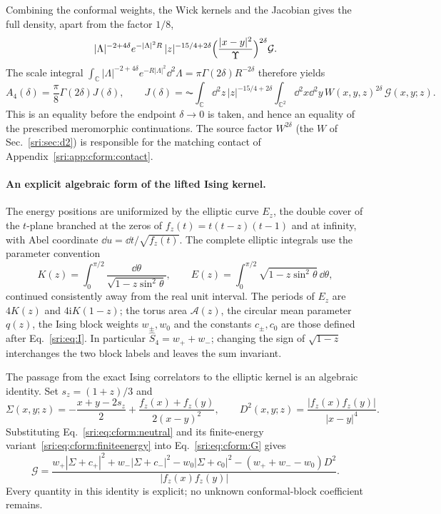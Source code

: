 Combining the conformal weights, the Wick kernels and the Jacobian gives the full density, apart from the factor $1/8$,
\begin{equation}
 |\Lambda|^{-2+4\delta}e^{-|\Lambda|^2R}\,|z|^{-15/4+2\delta}\Bigl(\frac{|x-y|^2}{\Upsilon}\Bigr)^{2\delta}\mathcal G.
\end{equation}
The scale integral $\int_{\mathbb C}|\Lambda|^{-2+4\delta}e^{-R|\Lambda|^2}\dd^2\Lambda=\pi\Gamma(2\delta)R^{-2\delta}$
therefore yields
\begin{equation}
 A_4(\delta)=\frac\pi8\Gamma(2\delta)J(\delta),\qquad
 J(\delta)=\AC\!\int_{\mathbb C}\dd^2z\,|z|^{-15/4+2\delta}\int_{\mathbb C^2}\dd^2x\dd^2y\,
 W(x,y,z)^{2\delta}\,\mathcal G(x,y;z).
 \label{sri:eq:cform:J}
\end{equation}
This is an equality before the endpoint $\delta\to0$ is taken, and hence an equality of the prescribed meromorphic
continuations. The source factor $W^{2\delta}$ (the $W$ of Sec.~\ref{sri:sec:d2}) is responsible for the matching contact
of Appendix~\ref{sri:app:cform:contact}.

\paragraph{An explicit algebraic form of the lifted Ising kernel.} The energy positions are uniformized by the
elliptic curve $E_z$, the double cover of the $t$-plane branched at the zeros of $f_z(t)=t(t-z)(t-1)$ and at infinity,
with Abel coordinate $\dd u=\dd t/\sqrt{f_z(t)}$. The complete elliptic integrals use the parameter convention
\begin{equation}
 K(z)=\int_0^{\pi/2}\frac{\dd\theta}{\sqrt{1-z\sin^2\theta}},\qquad
 E(z)=\int_0^{\pi/2}\sqrt{1-z\sin^2\theta}\,\dd\theta,
\end{equation}
continued consistently away from the real unit interval. The periods of $E_z$ are $4K(z)$ and $4\mathrm iK(1-z)$; the
torus area $\mathcal A(z)$, the circular mean parameter $q(z)$, the Ising block weights $w_\pm,w_0$ and the constants
$c_\pm,c_0$ are those defined after Eq.~\eqref{sri:eq:I}. In particular $\widehat S_4=w_++w_-$; changing the sign of
$\sqrt{1-z}$ interchanges the two block labels and leaves the sum invariant.

The passage from the exact Ising correlators to the elliptic kernel is an algebraic identity. Set $s_z=(1+z)/3$ and
\begin{equation}
 \Sigma(x,y;z)=-\frac{x+y-2s_z}{2}+\frac{f_z(x)+f_z(y)}{2(x-y)^2},\qquad
 D^2(x,y;z)=\frac{|f_z(x)f_z(y)|}{|x-y|^4}.
\end{equation}
Substituting Eq.~\eqref{sri:eq:cform:neutral} and its finite-energy variant~\eqref{sri:eq:cform:finiteenergy} into
Eq.~\eqref{sri:eq:cform:G} gives
\begin{equation}
 \mathcal G=\frac{w_+|\Sigma+c_+|^2+w_-|\Sigma+c_-|^2-w_0|\Sigma+c_0|^2-(w_++w_--w_0)D^2}{|f_z(x)f_z(y)|}.
 \label{sri:eq:cform:cover}
\end{equation}
Every quantity in this identity is explicit; no unknown conformal-block coefficient remains.

